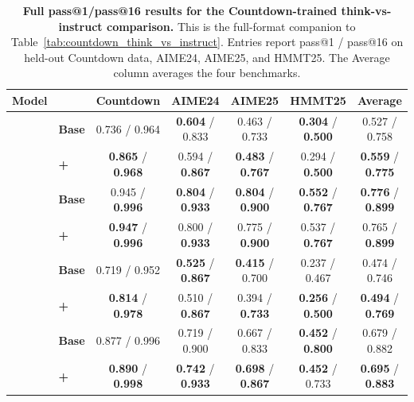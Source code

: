 \begin{table}[!htbp]
\centering
\caption{\textbf{Full pass@1/pass@16 results for the Countdown-trained think-vs-instruct comparison.}
This is the full-format companion to Table~\ref{tab:countdown_think_vs_instruct}. Entries report pass@1 / pass@16 on held-out Countdown data, AIME24, AIME25, and HMMT25. The Average column averages the four benchmarks.}
\label{tab:countdown_think_vs_instruct_full}
\footnotesize
\setlength{\tabcolsep}{4pt}
\renewcommand{\arraystretch}{1.12}

\newcommand{\metrichead}[1]{%
  \textbf{#1}%
}

\begin{tabular}{@{}llccccc@{}}
\toprule
\textbf{Model} &
& \metrichead{Countdown}
& \metrichead{AIME24}
& \metrichead{AIME25}
& \metrichead{HMMT25}
& \metrichead{Average} \\
\midrule

\multirow{2}{*}{\textbf{\qwenfourbinstruct{}}}
& \textbf{Base}
& 0.736 / 0.964
& \textbf{0.604} / 0.833
& 0.463 / 0.733
& \textbf{0.304} / \textbf{0.500}
& 0.527 / 0.758 \\
&
\textbf{+\opsd{}}
& \textbf{0.865} / \textbf{0.968}
& 0.594 / \textbf{0.867}
& \textbf{0.483} / \textbf{0.767}
& 0.294 / \textbf{0.500}
& \textbf{0.559} / \textbf{0.775} \\
\midrule

\multirow{2}{*}{\textbf{\qwenfourbthink{}}}
& \textbf{Base}
& 0.945 / \textbf{0.996}
& \textbf{0.804} / \textbf{0.933}
& \textbf{0.804} / \textbf{0.900}
& \textbf{0.552} / \textbf{0.767}
& \textbf{0.776} / \textbf{0.899} \\
&
\textbf{+\opsd{}}
& \textbf{0.947} / \textbf{0.996}
& 0.800 / \textbf{0.933}
& 0.775 / \textbf{0.900}
& 0.537 / \textbf{0.767}
& 0.765 / \textbf{0.899} \\
\midrule

\multirow{2}{*}{\textbf{\olmosevenbinstruct{}}}
& \textbf{Base}
& 0.719 / 0.952
& \textbf{0.525} / \textbf{0.867}
& \textbf{0.415} / 0.700
& 0.237 / 0.467
& 0.474 / 0.746 \\
&
\textbf{+\opsd{}}
& \textbf{0.814} / \textbf{0.978}
& 0.510 / \textbf{0.867}
& 0.394 / \textbf{0.733}
& \textbf{0.256} / \textbf{0.500}
& \textbf{0.494} / \textbf{0.769} \\
\midrule

\multirow{2}{*}{\textbf{\olmosevenbthink{}}}
& \textbf{Base}
& 0.877 / 0.996
& 0.719 / 0.900
& 0.667 / 0.833
& \textbf{0.452} / \textbf{0.800}
& 0.679 / 0.882 \\
&
\textbf{+\opsd{}}
& \textbf{0.890} / \textbf{0.998}
& \textbf{0.742} / \textbf{0.933}
& \textbf{0.698} / \textbf{0.867}
& \textbf{0.452} / 0.733
& \textbf{0.695} / \textbf{0.883} \\

\bottomrule
\end{tabular}
\end{table}
